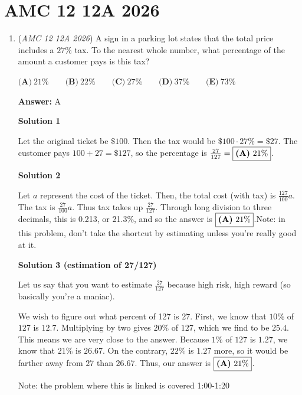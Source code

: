 \section{AMC 12 12A 2026}
        \begin{enumerate}
        	\item (\textit{AMC 12 12A 2026}) A sign in a parking lot states that the total price includes a $27\%$ tax. To the nearest whole number, what percentage of the amount a customer pays is this tax?


 $\textbf{(A)}\   21\%  \qquad 	\textbf{(B)}\   22\%  \qquad 	\textbf{(C)}\   27\%  \qquad 	\textbf{(D)}\   37\%  \qquad 	\textbf{(E)}\   73\%$

 \textbf{Answer: }A



\textbf{Solution 1}

Let the original ticket be $\$100$. Then the tax would be $\$100 \cdot 27\% = \$27$. The customer pays $100+27=\$127$, so the percentage is $\frac{27}{127}=\fbox{\textbf{(A)}\ 21\%}$.

 



\textbf{Solution 2}

Let $a$ represent the cost of the ticket. Then, the total cost (with tax) is $\frac{127}{100} a$. The tax is $\frac{27}{100}a$. Thus tax takes up $\frac{27}{127}$. Through long division to three decimals, this is 0.213, or 21.3\%, and so the answer is $\fbox{\textbf{(A)}\ 21\%}$.Note: in this problem, don't take the shortcut by estimating unless you're really good at it.

 



\textbf{Solution 3 (estimation of 27/127)}

Let us say that you want to estimate $\frac{27}{127}$ because high risk, high reward (so basically you're a maniac).

 We wish to figure out what percent of 127 is 27. First, we know that $10\%$ of $127$ is $12.7$. Multiplying by two gives $20\%$ of $127$, which we find to be $25.4$. This means we are very close to the answer. Because $1\%$ of $127$ is $1.27$, we know that $21\%$ is $26.67$. On the contrary, $22\%$ is $1.27$ more, so it would be farther away from $27$ than $26.67$. Thus, our answer is $\fbox{\textbf{(A)}\ 21\%}$.

 Note: the problem where this is linked is covered 1:00-1:20

 



\end{enumerate}

